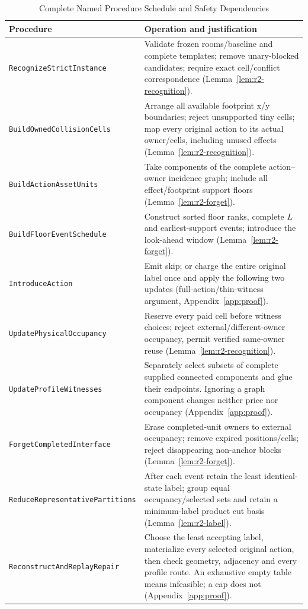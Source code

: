 \begin{table}[t]
\caption{Complete Named Procedure Schedule and Safety Dependencies}\label{tab:procedures}
\centering\footnotesize
\begin{tabular}{p{}p{}}
\toprule Procedure & Operation and justification \\\midrule
\texttt{RecognizeStrictInstance} & Validate frozen rooms/baseline and complete templates; remove unary-blocked candidates; require exact cell/conflict correspondence (Lemma~\ref{lem:r2-recognition}).\\
\texttt{BuildOwnedCollisionCells} & Arrange all available footprint x/y boundaries; reject unsupported tiny cells; map every original action to its actual owner/cells, including unused effects (Lemma~\ref{lem:r2-recognition}).\\
\texttt{BuildActionAssetUnits} & Take components of the complete action--owner incidence graph; include all effect/footprint support floors (Lemma~\ref{lem:r2-forget}).\\
\texttt{BuildFloorEventSchedule} & Construct sorted floor ranks, complete $L$ and earliest-support events; introduce the look-ahead window (Lemma~\ref{lem:r2-forget}).\\
\texttt{IntroduceAction} & Emit skip; or charge the entire original label once and apply the following two updates (full-action/thin-witness argument, Appendix~\ref{app:proof}).\\
\texttt{UpdatePhysicalOccupancy} & Reserve every paid cell before witness choices; reject external/different-owner occupancy, permit verified same-owner reuse (Lemma~\ref{lem:r2-recognition}).\\
\texttt{UpdateProfileWitnesses} & Separately select subsets of complete supplied connected components and glue their endpoints. Ignoring a graph component changes neither price nor occupancy (Appendix~\ref{app:proof}).\\
\texttt{ForgetCompletedInterface} & Erase completed-unit owners to external occupancy; remove expired positions/cells; reject disappearing non-anchor blocks (Lemma~\ref{lem:r2-forget}).\\
\texttt{ReduceRepresentativePartitions} & After each event retain the least identical-state label; group equal occupancy/selected sets and retain a minimum-label product cut basis (Lemma~\ref{lem:r2-label}).\\
\texttt{ReconstructAndReplayRepair} & Choose the least accepting label, materialize every selected original action, then check geometry, adjacency and every profile route. An exhaustive empty table means infeasible; a cap does not (Appendix~\ref{app:proof}).\\
\bottomrule\end{tabular}\end{table}

